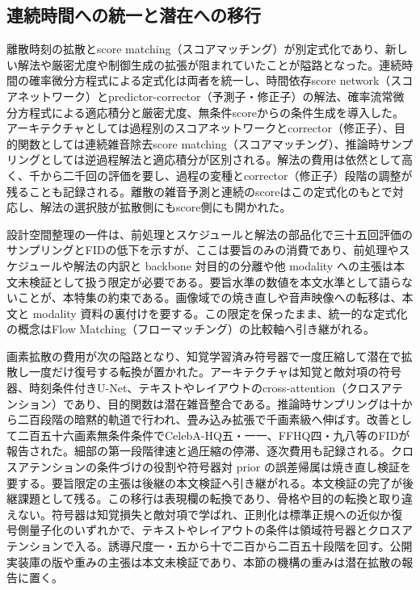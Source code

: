\documentclass[lualatex,a4paper,10pt]{jlreq}
\begin{document}
\subsection{連続時間への統一と潜在への移行}
離散時刻の拡散とscore matching（スコアマッチング）が別定式化であり、新しい解法や厳密尤度や制御生成の拡張が阻まれていたことが隘路となった。連続時間の確率微分方程式による定式化は両者を統一し、時間依存score network（スコアネットワーク）とpredictor-corrector（予測子・修正子）の解法、確率流常微分方程式による適応積分と厳密尤度、無条件scoreからの条件生成を導入した\autocite{btd021}。アーキテクチャとしては過程別のスコアネットワークとcorrector（修正子）、目的関数としては連続雑音除去score matching（スコアマッチング）、推論時サンプリングとしては逆過程解法と適応積分が区別される\autocite{btd021}。解法の費用は依然として高く、千から二千回の評価を要し、過程の変種とcorrector（修正子）段階の調整が残ることも記録される。離散の雑音予測と連続のscoreはこの定式化のもとで対応し、解法の選択肢が拡散側にもscore側にも開かれた\autocite{btd021}。

設計空間整理の一件は、前処理とスケジュールと解法の部品化で三十五回評価のサンプリングとFIDの低下を示すが、ここは要旨のみの消費であり、前処理やスケジュールや解法の内訳と backbone 対目的の分離や他 modality への主張は本文未検証として扱う限定が必要である\autocite{btd022}。要旨水準の数値を本文水準として語らないことが、本特集の約束である。画像域での焼き直しや音声映像への転移は、本文と modality 資料の裏付けを要する\autocite{btd022}。この限定を保ったまま、統一的な定式化の概念はFlow Matching（フローマッチング）の比較軸へ引き継がれる。

画素拡散の費用が次の隘路となり、知覚学習済み符号器で一度圧縮して潜在で拡散し一度だけ復号する転換が置かれた\autocite{btd023}。アーキテクチャは知覚と敵対項の符号器、時刻条件付きU-Net、テキストやレイアウトのcross-attention（クロスアテンション）であり、目的関数は潜在雑音整合である\autocite{btd023}。推論時サンプリングは十から二百段階の暗黙的軌道で行われ、畳み込み拡張で千画素級へ伸ばす。改善として二百五十六画素無条件条件でCelebA-HQ五・一一、FFHQ四・九八等のFIDが報告された\autocite{btd023}。細部の第一段階律速と過圧縮の停滞、逐次費用も記録される。クロスアテンションの条件づけの役割や符号器対 prior の誤差帰属は焼き直し検証を要する。要旨限定の主張は後継の本文検証へ引き継がれる。本文検証の完了が後継課題として残る。この移行は表現欄の転換であり、骨格や目的の転換と取り違えない\autocite{btd023}。符号器は知覚損失と敵対項で学ばれ、正則化は標準正規への近似か復号側量子化のいずれかで、テキストやレイアウトの条件は領域符号器とクロスアテンションで入る\autocite{btd023}。誘導尺度一・五から十で二百から二百五十段階を回す\autocite{btd023}。公開実装庫の版や重みの主張は本文未検証であり、本節の機構の重みは潜在拡散の報告に置く\autocite{btd023}。
\end{document}

